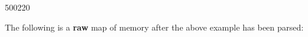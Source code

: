 \begin{fast_picture}{500}{220}
\nextGbox{}
\end{fast_picture}

The
following is a {\bf raw} map of memory after the above example
has been parsed:

